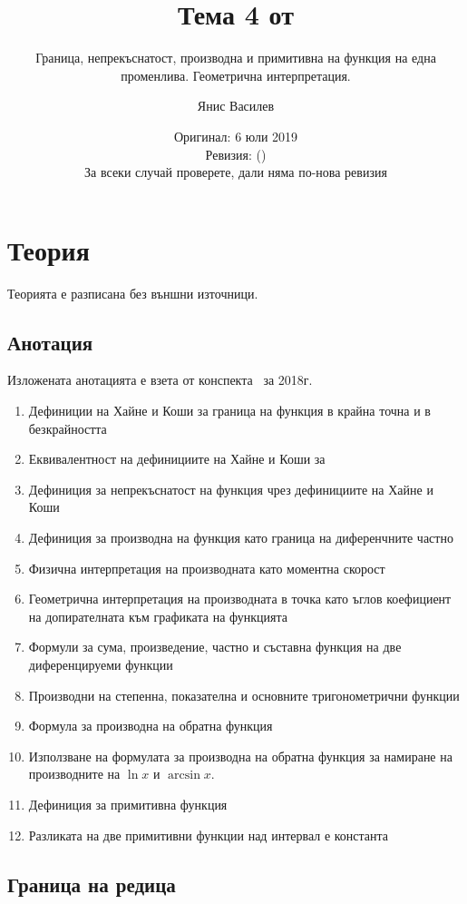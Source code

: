 \documentclass[numbers=endperiod, bibliography=totocnumbered]{scrartcl}
\title{Тема 4 от \URL{https://github.com/v--/se2018}}
\subtitle{Граница, непрекъснатост, производна и примитивна на функция на една променлива. Геометрична интерпретация.}
\author{Янис Василев}
\date{Оригинал: 6 юли 2019 \\ Ревизия: \gitAbbrevHash{} (\gitAuthorDate) \\ За всеки случай проверете, дали няма по-нова ревизия}
\begin{document}
\maketitle

\section{Теория}

Теорията е разписана без външни източници.

\subsection{Анотация}

Изложената анотацията е взета от конспекта~\cite{Syllabus} за 2018г.

\begin{enumerate}
  \item Дефиниции на Хайне и Коши за граница на функция в крайна точна и в безкрайността
  \item Еквивалентност на дефинициите на Хайне и Коши за
  \item Дефиниция за непрекъснатост на функция чрез дефинициите на Хайне и Коши
  \item Дефиниция за производна на функция като граница на диференчните частно
  \item Физична интерпретация на производната като моментна скорост
  \item Геометрична интерпретация на производната в точка като ъглов коефициент на допирателната към графиката на функцията
  \item Формули за сума, произведение, частно и съставна функция на две диференцируеми функции
  \item Производни на степенна, показателна и основните тригонометрични функции
  \item Формула за производна на обратна функция
  \item Използване на формулата за производна на обратна функция за намиране на производните на \( \ln x \) и \( \arcsin x \).
  \item Дефиниция за примитивна функция
  \item Разликата на две примитивни функции над интервал е константа
\end{enumerate}

\subsection{Граница на редица}
\end{document}
